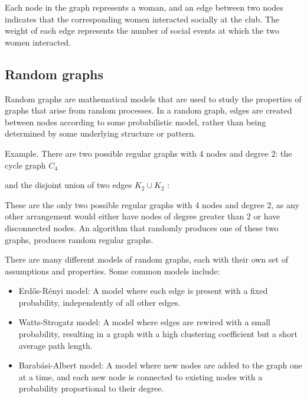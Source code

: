 Each node in the graph represents a woman, and an edge between two nodes indicates that the corresponding women interacted socially at the club. The weight of each edge represents the number of social events at which the two women interacted.

\subsection{Random graphs}

Random graphs are mathematical models that are used to study the properties of graphs that arise from random processes. In a random graph, edges are created between nodes according to some probabilistic model, rather than being determined by some underlying structure or pattern.


Example. There are two possible regular graphs with 4 nodes and degree 2: the cycle graph $C_4$
\begin{center}
\end{center}
 and the disjoint union of two edges $K_2 \cup K_2$ :
\begin{center}
\end{center}
These are the only two possible regular graphs with 4 nodes and degree 2, as any other arrangement would either have nodes of degree greater than 2 or have disconnected nodes. An algorithm that randomly produces one of these two graphs, produces random regular graphs.

There are many different models of random graphs, each with their own set of assumptions and properties. Some common models include:
\begin{itemize}
\item Erdős-Rényi model: A model where each edge is present with a fixed probability, independently of all other edges.
\item Watts-Strogatz model: A model where edges are rewired with a small probability, resulting in a graph with a high clustering coefficient but a short average path length.
\item Barabási-Albert model: A model where new nodes are added to the graph one at a time, and each new node is connected to existing nodes with a probability proportional to their degree.
\end{itemize}


